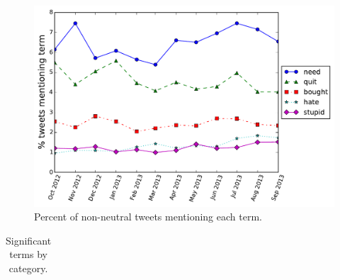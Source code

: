 \documentclass{sig-alternate}
\begin{document}
\begin{figure}[t]
  \caption{Percent of non-neutral tweets mentioning each term.}
  \includegraphics[width=\columnwidth]{nb/term_trends.pdf}  %
\end{figure}


\begin{table}[t]
\centering
\caption{Significant terms by category.}
\label{tab:terms}
\begin{tabular}{|r|p{14cm}| }
\hline

\hline
\end{tabular}
\end{table}



\end{document}
